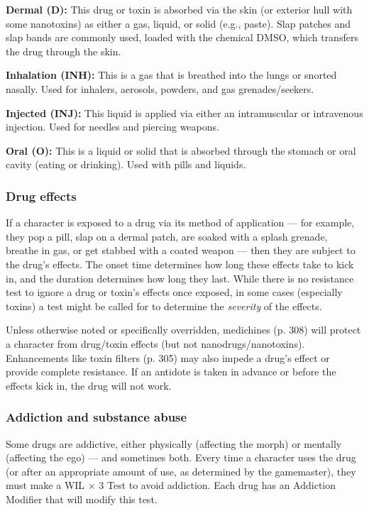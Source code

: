 \textbf{Dermal (D):} This drug or toxin is absorbed via the skin (or exterior hull with some nanotoxins) as either a gas, liquid, or solid (e.g., paste). Slap patches and slap bands are commonly used, loaded with the chemical DMSO, which transfers the drug through the skin. 

\textbf{Inhalation (INH):} This is a gas that is breathed into the lungs or snorted nasally. Used for inhalers, aerosols, powders, and gas grenades/seekers. 

\textbf{Injected (INJ):} This liquid is applied via either an intramuscular or intravenous injection. Used for needles and piercing weapons. 

\textbf{Oral (O):} This is a liquid or solid that is absorbed through the stomach or oral cavity (eating or drinking). Used with pills and liquids. 

\subsubsection{Drug effects} 

If a character is exposed to a drug via its method of application --- for example, they pop a pill, slap on a dermal patch, are soaked with a splash grenade, breathe in gas, or get stabbed with a coated weapon --- then they are subject to the drug’s effects. The onset time determines how long these effects take to kick in, and the duration determines how long they last. While there is no resistance test to ignore a drug or toxin’s effects once exposed, in some cases (especially toxins) a test might be called for to determine the \emph{severity} of the effects. 

Unless otherwise noted or specifically overridden, medichines (p. 308) will protect a character from drug/toxin effects (but not nanodrugs/nanotoxins). Enhancements like toxin filters (p. 305) may also impede a drug’s effect or provide complete resistance. If an antidote is taken in advance or before the effects kick in, the drug will not work. 

\subsubsection{Addiction and substance abuse} 

Some drugs are addictive, either physically (affecting the morph) or mentally (affecting the ego) --- and sometimes both. Every time a character uses the drug (or after an appropriate amount of use, as determined by the gamemaster), they must make a WIL $\times$ 3 Test to avoid addiction. Each drug has an Addiction Modifier that will modify this test. 

